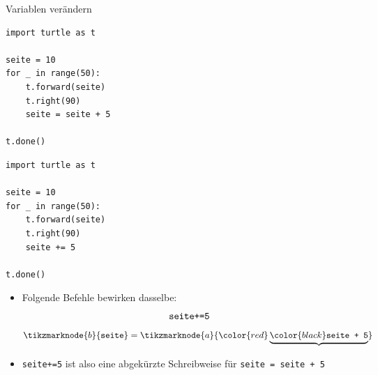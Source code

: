 \begin{frame}[fragile]{Variablen verändern}
    \begin{minipage}[c]{.49\linewidth}
        \begin{lstlisting}
import turtle as t

seite = 10
for _ in range(50):
    t.forward(seite)
    t.right(90)
    seite = seite + 5

t.done()
\end{lstlisting}
    \end{minipage}\hfill
    \begin{minipage}[c]{.49\linewidth}
        \begin{lstlisting}
import turtle as t

seite = 10
for _ in range(50):
    t.forward(seite)
    t.right(90)
    seite += 5

t.done()
\end{lstlisting}
    \end{minipage}

    \begin{itemize}
        \item<2-> Folgende Befehle bewirken dasselbe:\\
              \scriptsize
              \begin{equation}
                  \text{\texttt{seite+=5}}
              \end{equation}
              \begin{equation}
                  \tikzmarknode{b}{\text{\texttt{seite}}} =\tikzmarknode{a}{\color{red}\underbrace{\color{black}\text{\texttt{seite + 5}}}}
              \end{equation}
              \normalsize
        \item<3> \lstinline|seite+=5| ist also eine abgekürzte Schreibweise für \lstinline|seite = seite + 5|

    \end{itemize}
\end{frame}

